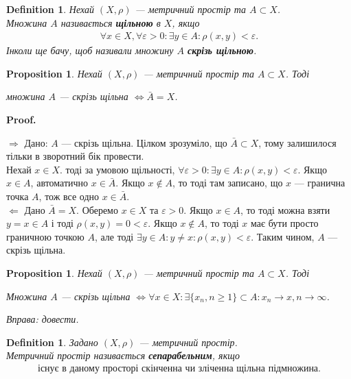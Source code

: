 \documentclass[a4paper, 10pt]{article}
\makeatletter
\def\rightproof{$\boxed{\Rightarrow}$ }
\def\leftproof{$\boxed{\Leftarrow}$ }
\theoremstyle{theoremdd}
\theoremstyle{theoremdd}
\newtheorem{definition}[theorem]{Definition}
\theoremstyle{theoremdd}
\theoremstyle{theoremdd}
\theoremstyle{theoremdd}
\newtheorem{proposition}[theorem]{Proposition}
\theoremstyle{theoremdd}
\theoremstyle{theoremdd}
\theoremstyle{theoremdd}
\renewenvironment{proof}[1][Proof.\\]{\par
\pushQED{\hfill \qed}%
\normalfont \topsep6\p@\@plus6\p@\relax
\trivlist
\item\relax
{\bfseries
#1\@addpunct{.}}\hspace\labelsep\ignorespaces
}{%
\popQED\endtrivlist\@endpefalse
}
\makeatother
\begin{document}
\begin{definition}
Нехай $(X, \rho)$ --- метричний простір та $A \subset X$.\\
Множина $A$ називається \textbf{щільною} в $X$, якщо
\begin{align*}
\forall x \in X, \forall \varepsilon > 0: \exists y \in A: \rho(x,y) < \varepsilon.
\end{align*}
Інколи ще бачу, щоб називали множину $A$ \textbf{скрізь щільною}.
\end{definition}

\begin{proposition}
Нехай $(X, \rho)$ --- метричний простір та $A \subset X$. Тоді
\begin{center}
множина $A$ --- скрізь щільна $\iff \bar{A} = X$.
\end{center}
\end{proposition}

\begin{proof}
\rightproof Дано: $A$ --- скрізь щільна. Цілком зрозуміло, що $\bar{A} \subset X$, тому залишилося тільки в зворотний бік провести.\\
Нехай $x \in X$. тоді за умовою щільності, $\forall \varepsilon > 0: \exists y \in A: \rho(x,y) < \varepsilon$. Якщо $x \in A$, автоматично $x \in \bar{A}$. Якщо $x \notin A$, то тоді там записано, що $x$ --- гранична точка $A$, тож все одно $x \in \bar{A}$.
\bigskip \\
\leftproof Дано $\bar{A} = X$. Оберемо $x \in X$ та $\varepsilon > 0$. Якщо $x \in A$, то тоді можна взяти $y = x \in A$ і тоді $\rho(x,y) = 0 < \varepsilon$. Якщо $x \notin A$, то тоді $x$ має бути просто граничною точкою $A$, але тоді $\exists y \in A: y \neq x: \rho(x,y) < \varepsilon$. Таким чином, $A$ --- скрізь щільна.
\end{proof}

\begin{proposition}
Нехай $(X, \rho)$ --- метричний простір та $A \subset X$. Тоді
\begin{center}
Множина $A$ --- скрізь щільна $\iff \forall x \in X: \exists \{x_n, n \geq 1\} \subset A: x_n \to x, n \to \infty$.
\end{center}
\textit{Вправа: довести.}
\end{proposition}

\begin{definition}
Задано $(X, \rho)$ --- метричний простір.\\
Метричний простір називається \textbf{сепарабельним}, якщо
\begin{align*}
\text{існує в даному просторі скінченна чи зліченна щільна підмножина.}
\end{align*}
\end{definition}
\end{document}
